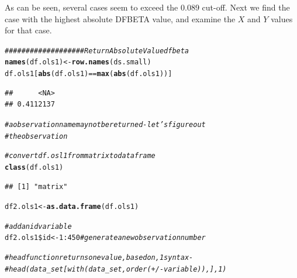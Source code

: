 \documentclass[11pt,openany]{book}\usepackage[]{graphicx}\usepackage[]{color}
\makeatletter
\newcommand{\hlnum}[1]{\textcolor[rgb]{0.686,0.059,0.569}{#1}}%
\newcommand{\hlcom}[1]{\textcolor[rgb]{0.678,0.584,0.686}{\textit{#1}}}%
\newcommand{\hlopt}[1]{\textcolor[rgb]{0,0,0}{#1}}%
\newcommand{\hlstd}[1]{\textcolor[rgb]{0.345,0.345,0.345}{#1}}%
\newcommand{\hlkwb}[1]{\textcolor[rgb]{0.69,0.353,0.396}{#1}}%
\newcommand{\hlkwd}[1]{\textcolor[rgb]{0.737,0.353,0.396}{\textbf{#1}}}%
\newenvironment{kframe}{%
 \def\at@end@of@kframe{}%
 \ifinner\ifhmode%
  \def\at@end@of@kframe{\end{minipage}}%
  \begin{minipage}{\columnwidth}%
 \fi\fi%
 \def\FrameCommand##1{\hskip\@totalleftmargin \hskip-\fboxsep
 \colorbox{shadecolor}{##1}\hskip-\fboxsep
     \hskip-\linewidth \hskip-\@totalleftmargin \hskip\columnwidth}%
 \MakeFramed {\advance\hsize-\width
   \@totalleftmargin\z@ \linewidth\hsize
   \@setminipage}}%
 {\par\unskip\endMakeFramed%
 \at@end@of@kframe}
\newenvironment{knitrout}{}{} %
\renewenvironment{knitrout}{\begin{singlespace}}{\end{singlespace}}
\makeatother
\begin{document}
As can be seen, several cases seem to exceed the $0.089$ cut-off. Next we find the case with the highest absolute DFBETA value, and examine the $X$ and $Y$ values for that case. 
\begin{knitrout}
\color{fgcolor}\begin{kframe}
\begin{alltt}
\hlcom{################### Return Absolute Value dfbeta}
\hlkwd{names}\hlstd{(df.ols1)} \hlkwb{<-} \hlkwd{row.names}\hlstd{(ds.small)}
\hlstd{df.ols1[}\hlkwd{abs}\hlstd{(df.ols1)} \hlopt{==} \hlkwd{max}\hlstd{(}\hlkwd{abs}\hlstd{(df.ols1))]}
\end{alltt}
\begin{verbatim}
##      <NA> 
## 0.4112137
\end{verbatim}
\begin{alltt}
\hlcom{# a observation name may not be returned - let's figure out}
\hlcom{# the observation}

\hlcom{# convert df.osl1 from matrix to dataframe}
\hlkwd{class}\hlstd{(df.ols1)}
\end{alltt}
\begin{verbatim}
## [1] "matrix"
\end{verbatim}
\begin{alltt}
\hlstd{df2.ols1} \hlkwb{<-} \hlkwd{as.data.frame}\hlstd{(df.ols1)}

\hlcom{# add an id variable}
\hlstd{df2.ols1}\hlopt{\$}\hlstd{id} \hlkwb{<-} \hlnum{1}\hlopt{:}\hlnum{450}  \hlcom{#  generate a new observation number}

\hlcom{# head function returns one value, based on ,1 syntax -}
\hlcom{# head(data_set[with(data_set, order(+/-variable)), ], 1)}


\end{alltt}
\end{kframe}
\end{knitrout}
\end{document}

